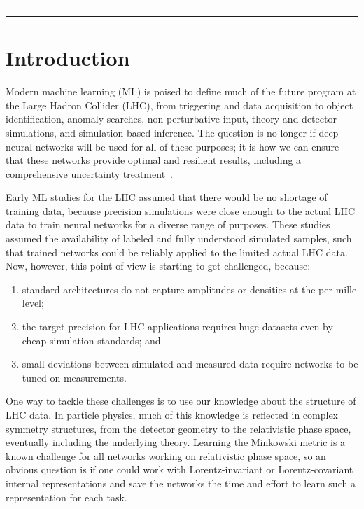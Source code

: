 \documentclass[submission, Phys]{SciPost}
\begin{document}

\vspace{10pt}
\noindent\rule{\textwidth}{1pt}
\tableofcontents\thispagestyle{fancy}
\noindent\rule{\textwidth}{1pt}
\vspace{10pt}

\newpage
\section{Introduction}
\label{sec:intro}

Modern machine learning (ML) is poised to define much of the future program at the Large Hadron Collider (LHC), from triggering and data acquisition to object identification, anomaly searches, non-perturbative input, theory and detector simulations, and simulation-based inference. The question is no longer if deep neural networks will be used for all of these purposes; it is how we can ensure that these networks provide optimal and resilient results, including a comprehensive uncertainty treatment~\cite{Plehn:2022ftl}. 

Early ML studies for the LHC assumed that there would be no shortage of training data, because precision simulations were close enough to the actual LHC data to train neural networks for a diverse range of purposes.
%
These studies assumed the availability of labeled and fully understood simulated samples, such that trained networks could be reliably applied to the limited actual LHC data.
%
Now, however, this point of view is starting to get challenged, because:
%
\begin{enumerate}
\item standard architectures do not capture amplitudes or densities at the per-mille level; 
\item the target precision for LHC applications requires huge datasets even by cheap simulation standards; and
\item small deviations between simulated and measured data require networks to be tuned on measurements.
\end{enumerate}
%
One way to tackle these challenges is to use our knowledge about the structure of LHC data. In particle physics, much of this knowledge is reflected in complex symmetry structures, from the detector geometry to the relativistic phase space, eventually including the underlying theory. Learning the Minkowski metric is a known challenge for all networks working on relativistic phase space, so an obvious question is if one could work with Lorentz-invariant or Lorentz-covariant internal representations and save the networks the time and effort to learn such a representation for each task.
\end{document}
